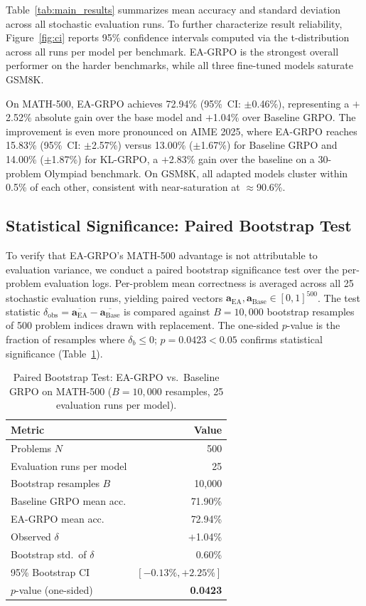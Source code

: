 \documentclass{article}
\begin{document}
Table~\ref{tab:main_results} summarizes mean accuracy and standard deviation across all stochastic evaluation runs. To further characterize result reliability, Figure~\ref{fig:ci} reports 95\% confidence intervals computed via the t-distribution across all runs per model per benchmark. EA-GRPO is the strongest overall performer on the harder benchmarks, while all three fine-tuned models saturate GSM8K.

On MATH-500, EA-GRPO achieves 72.94\% (95\%~CI: $\pm$0.46\%), representing a $+$2.52\% absolute gain over the base model and $+$1.04\% over Baseline GRPO. The improvement is even more pronounced on AIME 2025, where EA-GRPO reaches 15.83\% (95\%~CI: $\pm$2.57\%) versus 13.00\% ($\pm$1.67\%) for Baseline GRPO and 14.00\% ($\pm$1.87\%) for KL-GRPO, a $+$2.83\% gain over the baseline on a 30-problem Olympiad benchmark. On GSM8K, all adapted models cluster within 0.5\% of each other, consistent with near-saturation at $\approx$90.6\%.

\subsection{Statistical Significance: Paired Bootstrap Test}
\label{sec:bootstrap_app}
To verify that EA-GRPO's MATH-500 advantage is not attributable to evaluation variance, we conduct a paired bootstrap significance test over the per-problem evaluation logs. Per-problem mean correctness is averaged across all 25 stochastic evaluation runs, yielding paired vectors $\mathbf{a}_{\text{EA}},\mathbf{a}_{\text{Base}}\!\in\![0,1]^{500}$. The test statistic $\delta_\text{obs}=\overline{\mathbf{a}_{\text{EA}}}-\overline{\mathbf{a}_{\text{Base}}}$ is compared against $B=10{,}000$ bootstrap resamples of 500 problem indices drawn with replacement. The one-sided $p$-value is the fraction of resamples where $\delta_b\leq 0$; $p=0.0423<0.05$ confirms statistical significance (Table~\ref{tab:bootstrap_app}).

\begin{table}[!htbp]
\centering
\caption{Paired Bootstrap Test: EA-GRPO vs.\ Baseline GRPO on MATH-500 ($B=10{,}000$ resamples, 25 evaluation runs per model).}
\label{tab:bootstrap_app}
\small
\begin{tabular}{@{}lr@{}}
\toprule
\textbf{Metric} & \textbf{Value} \\
\midrule
Problems $N$                  & 500 \\
Evaluation runs per model     & 25 \\
Bootstrap resamples $B$       & 10{,}000 \\
Baseline GRPO mean acc.       & 71.90\% \\
EA-GRPO mean acc.             & 72.94\% \\
Observed $\delta$             & $+$1.04\% \\
Bootstrap std.\ of $\delta$  & 0.60\% \\
95\% Bootstrap CI             & $[-0.13\%, +2.25\%]$ \\
$p$-value (one-sided)         & \textbf{0.0423} \\
\bottomrule
\end{tabular}
\end{table}
\end{document}
